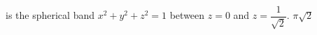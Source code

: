 {\surfaceS\ is the spherical band $x^2 + y^2 + z^2 = 1$ between $z=0$ and $z=\dfrac{1}{\sqrt{2}}$.
}
{$\pi \sqrt{2}$}

